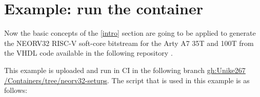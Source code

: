 \section{Example: run the container}

\label{run}

Now the basic concepts of the \ref{intro} section are going to be applied to generate the NEORV32 RISC-V soft-core bitstream for the Arty A7 35T and 100T from the VHDL code available in the following repository \cite{gh:neorv32} \cite{gh:neorv32-setups}.

\vspace{5mm}

\noindent This example is uploaded and run in CI in the following branch \href{https://github.com/Unike267/Containers/tree/neorv32-setups}{gh:Unike267 /Containers/tree/neorv32-setups}.
The script that is used in this example is as follows:

